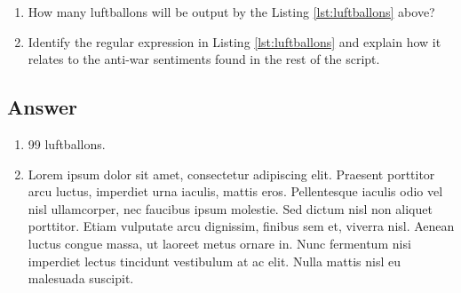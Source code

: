 \documentclass[
	12pt, %
]{../Template/fphw}
\begin{document}
\begin{problem}
	
	
	\begin{enumerate}
		\item How many luftballons will be output by the Listing \ref{lst:luftballons} above?
		\item Identify the regular expression in Listing \ref{lst:luftballons} and explain how it relates to the anti-war sentiments found in the rest of the script.
	\end{enumerate}

\end{problem}


\subsection*{Answer}

\begin{enumerate}
	\item 99 luftballons.
	\item Lorem ipsum dolor sit amet, consectetur adipiscing elit. Praesent porttitor arcu luctus, imperdiet urna iaculis, mattis eros. Pellentesque iaculis odio vel nisl ullamcorper, nec faucibus ipsum molestie. Sed dictum nisl non aliquet porttitor. Etiam vulputate arcu dignissim, finibus sem et, viverra nisl. Aenean luctus congue massa, ut laoreet metus ornare in. Nunc fermentum nisi imperdiet lectus tincidunt vestibulum at ac elit. Nulla mattis nisl eu malesuada suscipit.
\end{enumerate}

\end{document}
